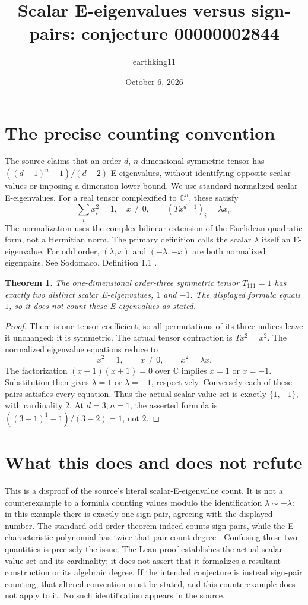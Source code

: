 \documentclass[10pt]{article}
\title{Scalar E-eigenvalues versus sign-pairs: conjecture 00000002844}
\author{earthking11}
\date{October 6, 2026}
\newtheorem{theorem}{Theorem}
\begin{document}
\maketitle
\section*{The precise counting convention}
The source claims that an order-$d$, $n$-dimensional symmetric tensor has
$((d-1)^n-1)/(d-2)$ E-eigenvalues, without identifying opposite scalar
values or imposing a dimension lower bound. We use standard normalized
scalar E-eigenvalues. For a real tensor complexified to $\mathbb C^n$,
these satisfy
\[
 \sum_i x_i^2=1,\quad x\neq0,\qquad
 (Tx^{d-1})_i=\lambda x_i.
\]
The normalization uses the complex-bilinear extension of the Euclidean
quadratic form, not a Hermitian norm. The primary definition calls the
scalar $\lambda$ itself an E-eigenvalue. For odd order,
$(\lambda,x)$ and $(-\lambda,-x)$ are both normalized eigenpairs.
See Sodomaco, Definition 1.1 \cite{sodomaco}.

\begin{theorem}
The one-dimensional order-three symmetric tensor $T_{111}=1$ has exactly
two distinct scalar E-eigenvalues, $1$ and $-1$. The displayed formula
equals $1$, so it does not count these E-eigenvalues as stated.
\end{theorem}
\begin{proof}
There is one tensor coefficient, so all permutations of its three
indices leave it unchanged: it is symmetric. The actual tensor
contraction is $Tx^2=x^2$. The normalized eigenvalue equations reduce to
\[
 x^2=1,\qquad x\neq0,\qquad x^2=\lambda x.
\]
The factorization $(x-1)(x+1)=0$ over $\mathbb C$ implies
$x=1$ or $x=-1$. Substitution then gives $\lambda=1$ or $\lambda=-1$,
respectively. Conversely each of these pairs satisfies every equation.
Thus the actual scalar-value set is exactly $\{1,-1\}$, with cardinality
$2$. At $d=3,n=1$, the asserted formula is
$((3-1)^1-1)/(3-2)=1$, not $2$.
\end{proof}

\section*{What this does and does not refute}
This is a disproof of the source's literal scalar-E-eigenvalue count.
It is not a counterexample to a formula counting values modulo the
identification $\lambda\sim-\lambda$: in this example there is exactly
one sign-pair, agreeing with the displayed number.
The standard odd-order theorem indeed counts sign-pairs, while the
E-characteristic polynomial has twice that pair-count degree
\cite{sodomaco}. Confusing these two quantities is precisely the issue.
The Lean proof establishes the actual scalar-value set and its cardinality;
it does not assert that it formalizes a resultant construction or its
algebraic degree. If the intended conjecture is instead sign-pair counting,
that altered convention must be stated, and this counterexample does not
apply to it. No such identification appears in the source.
\end{document}
